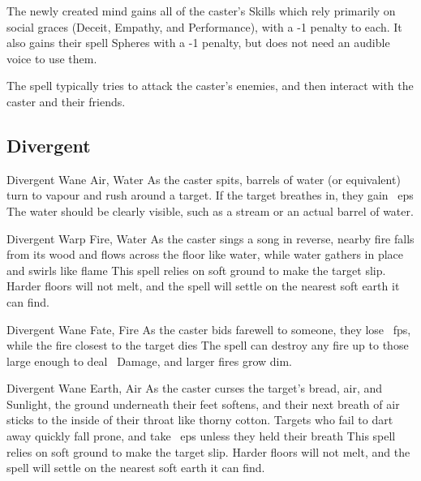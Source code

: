 \begin{multicols}{2}
{  The newly created mind gains all of the caster's Skills which rely primarily on social graces (Deceit, Empathy, and Performance), with a -1 penalty to each.
  It also gains their spell Spheres with a -1 penalty, but does not need an audible voice to use them.

  The spell typically tries to attack the caster's enemies, and then interact with the caster and their friends.

  }


\subsection{Divergent}

  {Divergent}%
  {Wane}%
  {Air, Water}%
  {}%
  {As the caster spits,  barrels of water (or equivalent) turn to vapour and rush around a target.
  If the target breathes in, they gain ~\glspl{ep}}%
  {
    The water should be clearly visible, such as a stream or an actual barrel of water.}

  {Divergent}%
  {Warp}%
  {Fire, Water}%
  {}%
  {As the caster sings a song in reverse, nearby fire falls from its wood and flows across the floor like water, while water gathers in place and swirls like flame}%
  {
  This spell relies on soft ground to make the target slip.
  Harder floors will not melt, and the spell will settle on the nearest soft earth it can find.}

  {Divergent}%
  {Wane}%
  {Fate, Fire}%
  {}%
  {As the caster bids farewell to someone, they lose \showDam~\glspl{fp}, while the fire closest to the target dies}%
  {
  The spell can destroy any fire up to those large enough to deal \showDam\ Damage, and larger fires grow dim.}

  {Divergent}%
  {Wane}%
  {Earth, Air}%
  {}%
  {As the caster curses the target's bread, air, and Sunlight, the ground underneath their feet softens, and their next breath of air sticks to the inside of their throat like thorny cotton.
  Targets who fail to dart away quickly fall prone, and take ~\glspl{ep} unless they held their breath}%
  {
  This spell relies on soft ground to make the target slip.
  Harder floors will not melt, and the spell will settle on the nearest soft earth it can find.}


\end{multicols}
